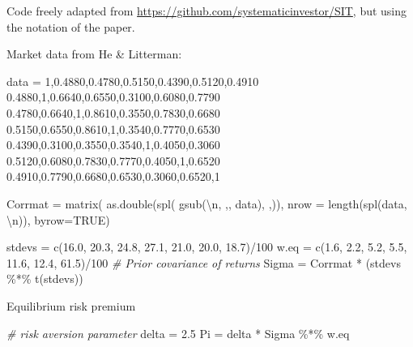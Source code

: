 \documentclass[
]{article}
\newenvironment{Shaded}{\begin{snugshade}}{\end{snugshade}}
\newcommand{\AttributeTok}[1]{\textcolor[rgb]{0.77,0.63,0.00}{#1}}
\newcommand{\CommentTok}[1]{\textcolor[rgb]{0.56,0.35,0.01}{\textit{#1}}}
\newcommand{\ConstantTok}[1]{\textcolor[rgb]{0.00,0.00,0.00}{#1}}
\newcommand{\DecValTok}[1]{\textcolor[rgb]{0.00,0.00,0.81}{#1}}
\newcommand{\FloatTok}[1]{\textcolor[rgb]{0.00,0.00,0.81}{#1}}
\newcommand{\FunctionTok}[1]{\textcolor[rgb]{0.00,0.00,0.00}{#1}}
\newcommand{\NormalTok}[1]{#1}
\newcommand{\OtherTok}[1]{\textcolor[rgb]{0.56,0.35,0.01}{#1}}
\newcommand{\SpecialCharTok}[1]{\textcolor[rgb]{0.00,0.00,0.00}{#1}}
\newcommand{\StringTok}[1]{\textcolor[rgb]{0.31,0.60,0.02}{#1}}
\begin{document}
Code freely adapted from
\url{https://github.com/systematicinvestor/SIT}, but using the notation
of the paper.

Market data from He \& Litterman:

\begin{Shaded}
\begin{Highlighting}[]
\NormalTok{ data }\OtherTok{=}
\StringTok{\textquotesingle{}1,0.4880,0.4780,0.5150,0.4390,0.5120,0.4910}
\StringTok{ 0.4880,1,0.6640,0.6550,0.3100,0.6080,0.7790}
\StringTok{ 0.4780,0.6640,1,0.8610,0.3550,0.7830,0.6680}
\StringTok{ 0.5150,0.6550,0.8610,1,0.3540,0.7770,0.6530}
\StringTok{ 0.4390,0.3100,0.3550,0.3540,1,0.4050,0.3060}
\StringTok{ 0.5120,0.6080,0.7830,0.7770,0.4050,1,0.6520}
\StringTok{ 0.4910,0.7790,0.6680,0.6530,0.3060,0.6520,1\textquotesingle{}}
  
\NormalTok{  Corrmat }\OtherTok{=} \FunctionTok{matrix}\NormalTok{( }\FunctionTok{as.double}\NormalTok{(}\FunctionTok{spl}\NormalTok{( }\FunctionTok{gsub}\NormalTok{(}\StringTok{\textquotesingle{}}\SpecialCharTok{\textbackslash{}n}\StringTok{\textquotesingle{}}\NormalTok{, }\StringTok{\textquotesingle{},\textquotesingle{}}\NormalTok{, data), }\StringTok{\textquotesingle{},\textquotesingle{}}\NormalTok{)), }
                    \AttributeTok{nrow =} \FunctionTok{length}\NormalTok{(}\FunctionTok{spl}\NormalTok{(data, }\StringTok{\textquotesingle{}}\SpecialCharTok{\textbackslash{}n}\StringTok{\textquotesingle{}}\NormalTok{)), }\AttributeTok{byrow=}\ConstantTok{TRUE}\NormalTok{)}
  
\NormalTok{  stdevs }\OtherTok{=} \FunctionTok{c}\NormalTok{(}\FloatTok{16.0}\NormalTok{, }\FloatTok{20.3}\NormalTok{, }\FloatTok{24.8}\NormalTok{, }\FloatTok{27.1}\NormalTok{, }\FloatTok{21.0}\NormalTok{,  }\FloatTok{20.0}\NormalTok{, }\FloatTok{18.7}\NormalTok{)}\SpecialCharTok{/}\DecValTok{100}
\NormalTok{  w.eq }\OtherTok{=} \FunctionTok{c}\NormalTok{(}\FloatTok{1.6}\NormalTok{, }\FloatTok{2.2}\NormalTok{, }\FloatTok{5.2}\NormalTok{, }\FloatTok{5.5}\NormalTok{, }\FloatTok{11.6}\NormalTok{, }\FloatTok{12.4}\NormalTok{, }\FloatTok{61.5}\NormalTok{)}\SpecialCharTok{/}\DecValTok{100}
  \CommentTok{\# Prior covariance of returns}
\NormalTok{  Sigma }\OtherTok{=}\NormalTok{ Corrmat }\SpecialCharTok{*}\NormalTok{ (stdevs }\SpecialCharTok{\%*\%} \FunctionTok{t}\NormalTok{(stdevs))}
\end{Highlighting}
\end{Shaded}

Equilibrium risk premium

\begin{Shaded}
\begin{Highlighting}[]
\CommentTok{\# risk aversion parameter}
\NormalTok{delta }\OtherTok{=} \FloatTok{2.5}
\NormalTok{Pi }\OtherTok{=}\NormalTok{ delta }\SpecialCharTok{*}\NormalTok{ Sigma }\SpecialCharTok{\%*\%}\NormalTok{ w.eq}
\end{Highlighting}
\end{Shaded}
\end{document}
